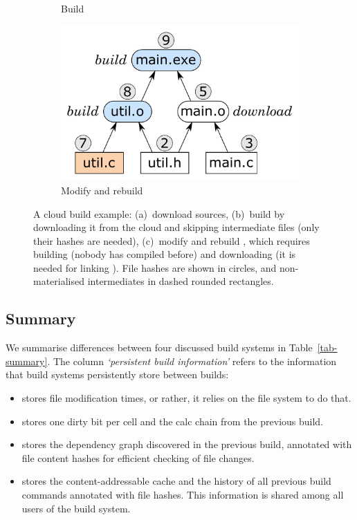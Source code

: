 \begin{figure}[t]
\begin{subfigure}[b]{0.40\linewidth}
\caption{Build }
\end{subfigure}
\begin{subfigure}[b]{0.31\linewidth}
\centerline{\includegraphics[scale=0.28]{fig/bazel-example-rebuild.pdf}}
\caption{Modify  and rebuild}
\end{subfigure}
\caption{A cloud build example: (a)~download sources, (b)~build 
by downloading it from the cloud and skipping intermediate files (only their
hashes are needed), (c)~modify  and rebuild , which
requires building  (nobody has compiled  before) and
downloading  (it is needed for linking ). File hashes
are shown in circles, and non-materialised intermediates in dashed rounded
rectangles.
\label{fig-bazel}}
\end{figure}

\subsection{Summary}
\label{sec-background-summary}

We summarise differences between four discussed build systems in
Table~\ref{tab-summary}. The column \emph{`persistent build information'} refers
to the information that build systems persistently store between builds:
\begin{itemize}
    \item \Make stores file modification times, or rather, it relies on the file
    system to do that.
    \item \Excel stores one dirty bit per cell and the calc chain from the
    previous build.
    \item \Shake stores the dependency graph discovered in the previous build,
    annotated with file content hashes for efficient checking of file changes.
    \item \Bazel stores the content-addressable cache and the history of all
    previous build commands annotated with file hashes. This information is
    shared among all users of the build system.
\end{itemize}

